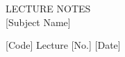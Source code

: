 \documentclass[a4paper, 11pt]{article}
\newcommand{\hln}{\vspace{-6mm}\begin{flushleft}\mbox{}\hrulefill\mbox{}\end{flushleft}\vspace{-6mm}}
\newcommand{\hsurround}[1]{\hln #1 \vspace{-6pt} \hln}
\theoremstyle{plain}
\theoremstyle{definition}
\begin{document}
\pagestyle{fancy}
\begin{center}
LECTURE NOTES\\

[Subject Name]

\hsurround{[Code] \hfill Lecture [No.] \hfill [Date]}
\end{center}
\end{document}
